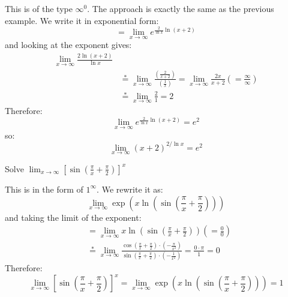 \begin{itemize}
\begin{example}
        This is of the type $\infty^0$. The approach is exactly the same as the previous example. We write it in exponential form:
        \begin{equation}
            =\lim_{x\to \infty} e^{\frac{2}{\ln x}\ln(x+2)}
        \end{equation}
        and looking at the exponent gives:
        \begin{align}
            \lim_{x\to\infty} \frac{2\ln(x+2)}{\ln x} \\ 
            &\stackrel{*}{=} \lim_{x\to \infty} \frac{\left(\frac{2}{x+2}\right)}{\left(\frac{1}{x}\right)} = \lim_{x\to \infty} \frac{2x}{x+2}\left( = \frac{\infty}{\infty}\right) \\ 
            &\stackrel{*}{=} \lim_{x\to \infty} \frac{2}{1} = 2
        \end{align}
        Therefore:
        \begin{equation}
            \lim_{x\to \infty} e^{\frac{2}{\ln x}\ln(x+2)} = e^2
        \end{equation}
        so:
        \begin{equation}
            \lim_{x\to\infty}(x+2)^{2/\ln x} = e^2
        \end{equation}
    \end{example}
    \begin{example}
        Solve $\lim_{x\to \infty} \left[\sin\left(\frac{\pi}{x}+\frac{\pi}{2}\right)\right]^x$
        \vspace{2mm}

        This is in the form of $1^\infty$. We rewrite it as:
        \begin{equation}
            \lim_{x\to \infty} \exp\left(x\ln\left(\sin\left(\frac{\pi}{x}+\frac{\pi}{2}\right)\right)\right)
        \end{equation}
        and taking the limit of the exponent:
        \begin{align}
            &= \lim_{x\to \infty} x\ln\left(\sin\left(\frac{\pi}{x}+\frac{\pi}{2}\right)\right) \left(=\frac{0}{0}\right)\\ 
            &\stackrel{*}{=} \lim_{x\to \infty} \frac{\cos\left(\frac{\pi}{x}+\frac{\pi}{2}\right) \cdot \left(-\frac{\pi}{x^2}\right)}{\sin\left(\frac{\pi}{x}+\frac{\pi}{2}\right) \cdot \left(-\frac{1}{x^2}\right)} = \frac{0\cdot \pi}{1} = 0
        \end{align}
        Therefore:
        \begin{equation}
            \lim_{x\to \infty} \left[\sin\left(\frac{\pi}{x}+\frac{\pi}{2}\right)\right]^x = \lim_{x\to \infty} \exp\left(x\ln\left(\sin\left(\frac{\pi}{x}+\frac{\pi}{2}\right)\right)\right) = 1
        \end{equation}
    \end{example}
    
\end{itemize}